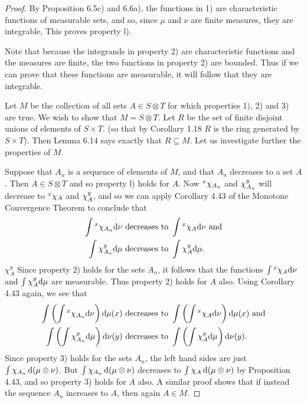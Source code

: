 \begin{proof}
By Proposition 6.5c) and 6.6a), the functions in 1) are characteristic functions of measurable sets, and so, since $\mu$ and $\nu$ are finite measures, they are integrable, This proves property l).

Note that because the integrands in property 2) are characteristic functions and the measures are finite, the two functions in property 2) are bounded. Thus if we can prove that these functions are measurable, it will follow that they are integrable.

Let $M$ be the collection of all sets $A\in S\otimes T$ for which properties 1), 2) and 3) are true. We wish to show that $M=S\otimes T$. Let $R$ be the set of finite disjoint unions of elements of $S\times T$. (so that by Corollary 1.18 $R$ is the ring generated by $S\times T$). Then Lemma 6.14 says exactly that $R\subseteq M$. Let us investigate further the properties of $M$.

Suppose that $A_n$ is a sequence of elements of $M$, and that $A_n$ decreases to a set $A$. Then $A\in S\otimes T$ and so property l) holds for $A$. Now $\xsec{\idf{A_n}}{x}$ and $\ysec{\idf{A_n}}{y}$ will decrease to $\xsec{\idf{A}}{x}$ and $\ysec{\idf{A}}{y}$, and so we can apply Corollary 4.43 of the Monotone Convergence Theorem to conclude that
\begin{align*}
\int\xsec{\idf{A_n}}{x}\dd\nu&\text { decreases to }\int\xsec{\idf{A}}{x}\dd\nu\text{ and}\\
\int\ysec{\idf{A_n}}{y}\dd\mu&\text { decreases to }\int\ysec{\idf{A}}{y}\dd\mu.
\end{align*}
$\chi_A^y$ Since property 2) holds for the sets $A_n$, it follows that the functions $\int\xsec{\idf{A}}{x}\dd\nu$ and $\int\ysec{\idf{A}}{y}\dd\mu$ are measurable. Thus property 2) holds for $A$ also. Using Corollary 4.43 again, we see that
\begin{align*}
\int\br{\int\xsec{\idf{A_n}}{x}\dd\nu}\dd\mu(x)&\text { decreases to }\int\br{\int\xsec{\idf{A}}{x}\dd\nu}\dd\mu(x)\text{ and}\\
\int\br{\int\ysec{\idf{A_n}}{y}\dd\mu}\dd\nu(y)&\text { decreases to }\int\br{\int\ysec{\idf{A}}{y}\dd\mu}\dd\nu(y).
\end{align*}
Since property 3) holds for the sets $A_n$, the left hand sides are just $\int\idf{A_n}\dd(\mu\otimes\nu)$. But $\int\idf{A_n}\dd(\mu\otimes\nu)$ decreases to $\int\idf{A}\dd(\mu\otimes\nu)$ by Proposition 4.43, and so property 3) holds for $A$ also. A similar proof shows that if instead the sequence $A_n$ increases to $A$, then again $A\in M$.


\end{proof}
